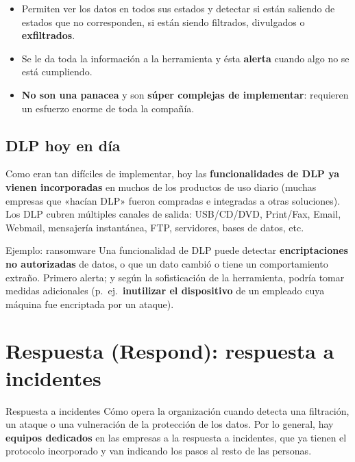\documentclass[11pt,a4paper]{article}
\begin{document}
\begin{itemize}[leftmargin=1.4em,itemsep=2pt]
  \item Permiten ver los datos en todos sus estados y detectar si están saliendo de estados
        que no corresponden, si están siendo filtrados, divulgados o \textbf{exfiltrados}.
  \item Se le da toda la información a la herramienta y ésta \textbf{alerta} cuando algo no se
        está cumpliendo.
  \item \textbf{No son una panacea} y son \textbf{súper complejas de implementar}: requieren un
        esfuerzo enorme de toda la compañía.
\end{itemize}

\subsection{DLP hoy en día}

Como eran tan difíciles de implementar, hoy las \textbf{funcionalidades de DLP ya vienen
incorporadas} en muchos de los productos de uso diario (muchas empresas que «hacían DLP»
fueron compradas e integradas a otras soluciones). Los DLP cubren múltiples canales de salida:
USB/CD/DVD, Print/Fax, Email, Webmail, mensajería instantánea, FTP, servidores, bases de datos,
etc.

\begin{notebox}{Ejemplo: ransomware}
Una funcionalidad de DLP puede detectar \textbf{encriptaciones no autorizadas} de datos, o que
un dato cambió o tiene un comportamiento extraño. Primero alerta; y según la sofisticación de
la herramienta, podría tomar medidas adicionales (p.\ ej.\ \textbf{inutilizar el dispositivo}
de un empleado cuya máquina fue encriptada por un ataque).
\end{notebox}

\section{Respuesta (Respond): respuesta a incidentes}

\begin{defbox}{Respuesta a incidentes}
Cómo opera la organización cuando detecta una filtración, un ataque o una vulneración de la
protección de los datos. Por lo general, hay \textbf{equipos dedicados} en las empresas a la
respuesta a incidentes, que ya tienen el protocolo incorporado y van indicando los pasos al
resto de las personas.
\end{defbox}
\end{document}
